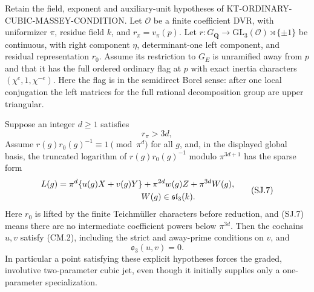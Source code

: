 \begin{proposition}
Retain the field, exponent and auxiliary-unit hypotheses
of KT-ORDINARY-CUBIC-MASSEY-CONDITION.
Let $\mathcal O$ be a finite coefficient DVR, with
uniformizer $\pi$, residue field $k$, and
$r_\pi=v_\pi(p)$.
Let $r:G_{\mathbf Q}\to
\mathrm{GL}_3(\mathcal O)\rtimes\{\pm1\}$ be continuous,
with right component $\eta$, determinant-one left component,
and residual representation $r_0$.
Assume its restriction to $G_E$ is unramified away from
$p$ and that it has the full ordered ordinary flag at $p$
with exact inertia characters $(\chi^e,1,\chi^{-e})$.
Here the flag is in the semidirect Borel sense: after
one local conjugation the left matrices for the full
rational decomposition group are upper triangular.

Suppose an integer $d\ge1$ satisfies
\[
                              r_\pi>3d,                       \tag{SJ.6}
\]
Assume $r(g)r_0(g)^{-1}\equiv1\pmod{\pi^d}$ for all $g$,
and, in the displayed global basis, the truncated logarithm of
$r(g)r_0(g)^{-1}$ modulo $\pi^{3d+1}$ has the sparse form
\[
\begin{split}
 L(g)={}&\pi^d\{u(g)X+v(g)Y\}
             +\pi^{2d}w(g)Z+\pi^{3d}W(g),\\
 &\hspace{30mm}W(g)\in\mathfrak{sl}_3(k).
\end{split}                                                   \tag{SJ.7}
\]
Here $r_0$ is lifted by the finite Teichm\"uller characters
before reduction, and (SJ.7) means there are no intermediate
coefficient powers below $\pi^{3d}$.
Then the cochains $u,v$ satisfy (CM.2), including the strict
and away-prime conditions on $v$, and
\[
                             \mathfrak o_3(u,v)=0.             \tag{SJ.8}
\]
In particular a point satisfying these explicit hypotheses
forces the graded, involutive two-parameter cubic jet, even
though it initially supplies only a one-parameter specialization.
\end{proposition}
